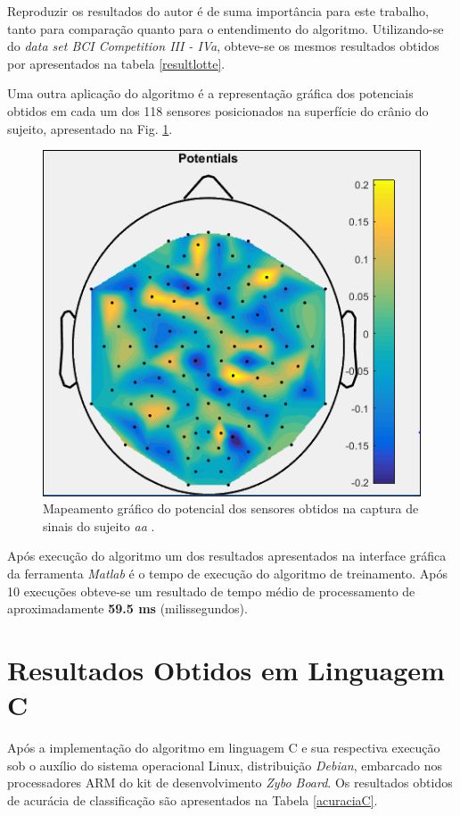 Reproduzir os resultados do autor é de suma importância para este trabalho, tanto para comparação quanto para o entendimento do algoritmo. Utilizando-se do \textit{data set BCI Competition III - IVa}, obteve-se os mesmos resultados obtidos por \cite{F.Lotte} apresentados na tabela \ref{resultlotte}.

Uma outra aplicação do algoritmo é a representação gráfica dos potenciais obtidos em cada um dos 118 sensores posicionados na superfície do crânio do sujeito, apresentado na Fig. \ref{resultadoLotte}.
\newpage
\begin{figure}[h]
	\centering
	\includegraphics[keepaspectratio=true,scale=0.45]{figuras/image_csp_matlab.PNG}
	\caption{Mapeamento gráfico do potencial dos sensores obtidos na captura de sinais do sujeito \textit{aa} \cite{F.Lotte}.}
	\label{resultadoLotte}
\end{figure}

Após execução do algoritmo um dos resultados apresentados na interface gráfica da ferramenta \textit{Matlab} é o tempo de execução do algoritmo de treinamento. Após 10 execuções obteve-se um resultado de tempo médio de processamento de aproximadamente \textbf{59.5 ms} (milissegundos).

\section{Resultados Obtidos em Linguagem C}
Após a implementação do algoritmo em linguagem C e sua respectiva execução sob o auxílio do sistema operacional Linux, distribuição \textit{Debian}, embarcado nos processadores ARM do kit de desenvolvimento \textit{Zybo Board}. Os resultados obtidos de acurácia de classificação são apresentados na Tabela \ref{acuraciaC}.

